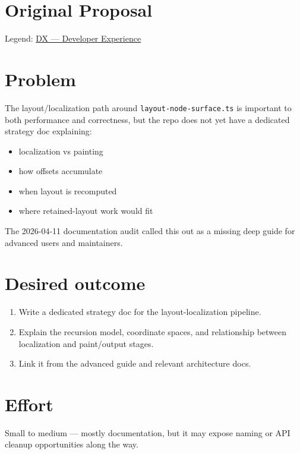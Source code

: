 \section{Original Proposal}\label{record-332-original-proposal}

Legend: \href{https://github.com/flyingrobots/bijou/blob/1853ad902f6bf219326409e7f743a5a1d6517dbc/docs/method/legends/DX-developer-experience.md}{DX --- Developer Experience}

\section{Problem}\label{record-332-problem}

The layout/localization path around \texttt{l\allowbreak{}a\allowbreak{}y\allowbreak{}o\allowbreak{}u\allowbreak{}t\allowbreak{}-\allowbreak{}n\allowbreak{}o\allowbreak{}d\allowbreak{}e\allowbreak{}-\allowbreak{}s\allowbreak{}u\allowbreak{}r\allowbreak{}f\allowbreak{}a\allowbreak{}c\allowbreak{}e\allowbreak{}.\allowbreak{}t\allowbreak{}s} is important to both performance and correctness, but the repo does not yet have a dedicated strategy doc explaining:

\begin{itemize}
\tightlist
\item
  localization vs painting
\item
  how offsets accumulate
\item
  when layout is recomputed
\item
  where retained-layout work would fit
\end{itemize}

The 2026-04-11 documentation audit called this out as a missing deep guide for advanced users and maintainers.

\section{Desired outcome}\label{record-332-desired-outcome}

\begin{enumerate}
\def\labelenumi{\arabic{enumi}.}
\tightlist
\item
  Write a dedicated strategy doc for the layout-localization pipeline.
\item
  Explain the recursion model, coordinate spaces, and relationship between localization and paint/output stages.
\item
  Link it from the advanced guide and relevant architecture docs.
\end{enumerate}

\section{Effort}\label{record-332-effort}

Small to medium --- mostly documentation, but it may expose naming or API cleanup opportunities along the way.

